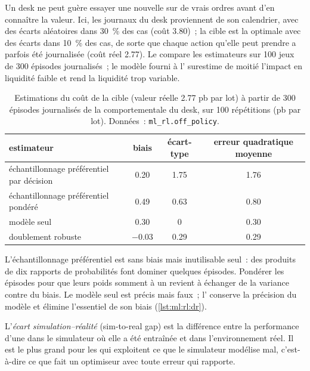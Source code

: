Un desk ne peut guère essayer une nouvelle  sur de vrais ordres avant d'en connaître la valeur. Ici, les journaux du desk proviennent de son
calendrier, avec des écarts aléatoires dans 30~\% des cas (coût 3.80)~; la cible est la  optimale avec des écarts dans 10~\% des
cas, de sorte que chaque action qu'elle peut prendre a parfois été journalisée (coût réel 2.77). Le  compare les estimateurs
sur 100 jeux de 300 épisodes journalisés~; le modèle fourni à l' surestime de moitié
l'impact en liquidité faible et rend la liquidité trop variable.

\begin{table}[htbp]
\centering\small
\begin{tabular}{@{}lccc@{}}
\toprule
estimateur & biais & écart-type & erreur quadratique moyenne\\
\midrule
échantillonnage préférentiel par décision & 0.20 & 1.75 & 1.76\\
échantillonnage préférentiel pondéré & 0.49 & 0.63 & 0.80\\
modèle seul & 0.30 & 0 & 0.30\\
doublement robuste & $-0.03$ & 0.29 & 0.29\\
\bottomrule
\end{tabular}
\caption{Estimations du coût de la  cible (valeur réelle 2.77 pb par lot) à partir de 300 épisodes journalisés de la
 comportementale du desk, sur 100 répétitions (pb par lot). Données~: \texttt{ml\_rl.off\_policy}.}\label{tab:ml:rl:ope}
\end{table}

L'échantillonnage préférentiel est sans biais mais inutilisable seul~: des produits de dix rapports de probabilités font dominer quelques épisodes. Pondérer
les épisodes pour que leurs poids somment à un revient à échanger de la variance contre du biais. Le modèle seul est précis mais faux~; l' conserve
la précision du modèle et élimine l'essentiel de son biais (\cref{lst:ml:rl:dr}).

\begin{definition}\label{def:ml:reinforcement-learning-foundations:simreal}
L'\emph{écart simulation--réalité} (sim-to-real gap) est la différence entre la performance d'une  dans le simulateur
où elle a été entraînée et dans l'environnement réel. Il est le plus grand pour les  qui exploitent ce que le simulateur modélise mal,
c'est-à-dire ce que fait un optimiseur avec toute erreur qui rapporte.
\end{definition}

